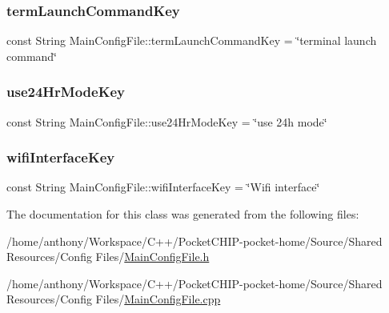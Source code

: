 \subsubsection{\texorpdfstring{term\+Launch\+Command\+Key}{termLaunchCommandKey}}
{\footnotesize\ttfamily const String Main\+Config\+File\+::term\+Launch\+Command\+Key = \char`\"{}terminal launch command\char`\"{}\hspace{0.3cm}{\ttfamily [static]}}

\mbox{\label{classMainConfigFile_ac8433e4a6b136435be61b9a348abb131}} 
\subsubsection{\texorpdfstring{use24\+Hr\+Mode\+Key}{use24HrModeKey}}
{\footnotesize\ttfamily const String Main\+Config\+File\+::use24\+Hr\+Mode\+Key = \char`\"{}use 24h mode\char`\"{}\hspace{0.3cm}{\ttfamily [static]}}

\mbox{\label{classMainConfigFile_ab4e4470a18947cb402ecaf9287e453a3}} 
\subsubsection{\texorpdfstring{wifi\+Interface\+Key}{wifiInterfaceKey}}
{\footnotesize\ttfamily const String Main\+Config\+File\+::wifi\+Interface\+Key = \char`\"{}Wifi interface\char`\"{}\hspace{0.3cm}{\ttfamily [static]}}



The documentation for this class was generated from the following files\+:\begin{DoxyCompactItemize}
\item 
/home/anthony/\+Workspace/\+C++/\+Pocket\+C\+H\+I\+P-\/pocket-\/home/\+Source/\+Shared Resources/\+Config Files/\mbox{\hyperlink{MainConfigFile_8h}{Main\+Config\+File.\+h}}\item 
/home/anthony/\+Workspace/\+C++/\+Pocket\+C\+H\+I\+P-\/pocket-\/home/\+Source/\+Shared Resources/\+Config Files/\mbox{\hyperlink{MainConfigFile_8cpp}{Main\+Config\+File.\+cpp}}\end{DoxyCompactItemize}
